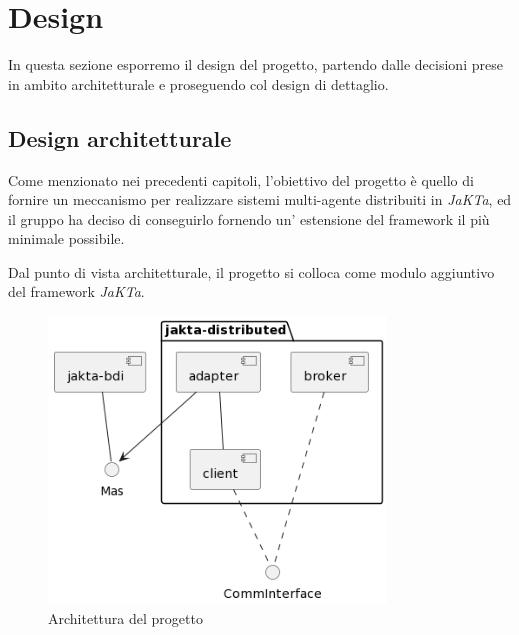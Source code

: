 \section{Design}




In questa sezione esporremo il design del progetto, partendo dalle decisioni prese in ambito architetturale e proseguendo
col design di dettaglio.

\subsection{Design architetturale}

Come menzionato nei precedenti capitoli, l'obiettivo del progetto è quello di fornire un meccanismo per realizzare sistemi multi-agente distribuiti in \textit{JaKTa}, ed
il gruppo ha deciso di conseguirlo fornendo un' estensione del framework il più minimale possibile.

Dal punto di vista architetturale, il progetto si colloca come modulo aggiuntivo del framework \textit{JaKTa}.

\begin{figure}[h]
    \centering
    \includegraphics[width=0.8\textwidth]{figures/architecture.png}
    \caption{Architettura del progetto}
    \label{fig:architecture}
\end{figure}

